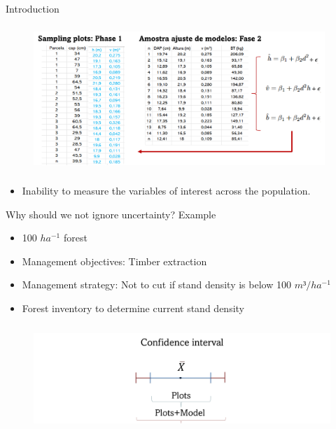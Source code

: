 \documentclass{beamer}
\begin{document}
\begin{frame}{Introduction}
\begin{figure}
        \centering
        \includegraphics[width = 11cm, height = 5.5cm]{Imagem9.jpg}
        \end{figure}
\begin{itemize}
    \item Inability to measure the variables of interest across the population.
\end{itemize}
\end{frame}

\begin{frame}{Why should we not ignore uncertainty? }
Example
\begin{itemize}
    \item 100 $ha^{-1}$ forest 
    \item Management objectives: Timber extraction
    \item Management strategy: Not to cut if stand density is below 100 $m³/ha^{-1}$
    \item Forest inventory to determine current stand density
\end{itemize}
\begin{figure}
        \centering
        \includegraphics[width = 12cm, height = 4cm]{pic/Imagem6.jpg}
        \end{figure}
\end{frame}
\end{document}
